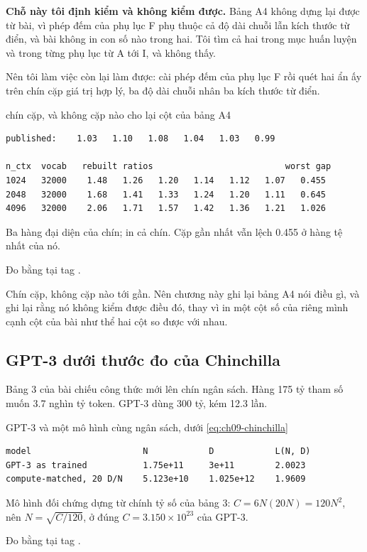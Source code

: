 \textbf{Chỗ này tôi định kiểm và không kiểm được.} Bảng A4 không dựng lại được
từ bài, vì phép đếm của phụ lục F phụ thuộc cả độ dài chuỗi lẫn kích thước từ
điển, và bài không in con số nào trong hai. Tôi tìm cả hai trong mục huấn luyện
và trong từng phụ lục từ A tới I, và không thấy.

Nên tôi làm việc còn lại làm được: cài phép đếm của phụ lục F rồi quét hai ẩn
ấy trên chín cặp giá trị hợp lý, ba độ dài chuỗi nhân ba kích thước từ điển.

\begin{measured}{chín cặp, và không cặp nào cho lại cột của bảng A4}
\begin{verbatim}
published:    1.03   1.10   1.08   1.04   1.03   0.99

n_ctx  vocab   rebuilt ratios                          worst gap
1024   32000    1.48   1.26   1.20   1.14   1.12   1.07   0.455
2048   32000    1.68   1.41   1.33   1.24   1.20   1.11   0.645
4096   32000    2.06   1.71   1.57   1.42   1.36   1.21   1.026
\end{verbatim}

Ba hàng đại diện của chín;  in cả chín. Cặp gần nhất vẫn
lệch 0.455 ở hàng tệ nhất của nó.

Đo bằng  tại tag .
\end{measured}

Chín cặp, không cặp nào tới gần. Nên chương này ghi lại bảng A4 nói điều gì, và
ghi lại rằng nó không kiểm được điều đó, thay vì in một cột số của riêng mình
cạnh cột của bài như thể hai cột so được với nhau.

\subsection*{GPT-3 dưới thước đo của Chinchilla}

%
Bảng 3 của bài chiếu công thức mới lên chín ngân sách. Hàng 175 tỷ tham số muốn
3.7 nghìn tỷ token. GPT-3 dùng 300 tỷ, kém 12.3 lần.

\begin{measured}{GPT-3 và một mô hình cùng ngân sách, dưới \eqref{eq:ch09-chinchilla}}
\begin{verbatim}
model                      N            D            L(N, D)
GPT-3 as trained           1.75e+11     3e+11        2.0023
compute-matched, 20 D/N    5.123e+10    1.025e+12    1.9609
\end{verbatim}

Mô hình đối chứng dựng từ chính tỷ số của bảng 3: \(C = 6N(20N) = 120N^2\), nên
\(N = \sqrt{C/120}\), ở đúng \(C = 3.150 \times 10^{23}\) của GPT-3.

Đo bằng  tại tag .
\end{measured}

